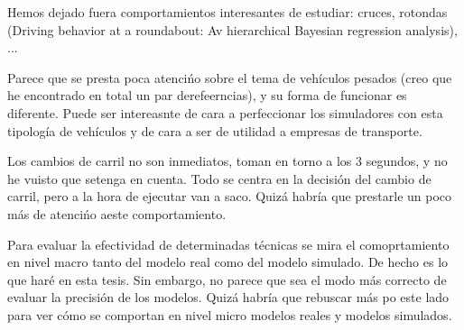 Hemos dejado fuera comportamientos interesantes de estudiar: cruces, rotondas (Driving behavior at a roundabout: Av hierarchical Bayesian regression analysis), ...

Parece que se presta poca atencińo sobre el tema de vehículos pesados (creo que he encontrado en total un par derefeerncias), y su forma de funcionar es diferente. Puede ser intereasnte de cara a perfeccionar los simuladores con esta tipología de vehículos y de cara a ser de utilidad a empresas de transporte.

Los cambios de carril no son inmediatos, toman en torno a los 3 segundos, y no he vuisto que setenga en cuenta. Todo se centra en la decisión del cambio de carril, pero a la hora de ejecutar van a saco. Quizá habría que prestarle un poco más de atencińo aeste comportamiento.

Para evaluar la efectividad de determinadas técnicas se mira el comoprtamiento en nivel macro tanto del modelo real como del modelo simulado. De hecho es lo que haré en esta tesis. Sin embargo, no parece que sea el modo más correcto de evaluar la precisión de los modelos. Quizá habría que rebuscar más po este lado para ver cómo se comportan en nivel micro modelos reales y modelos simulados.

